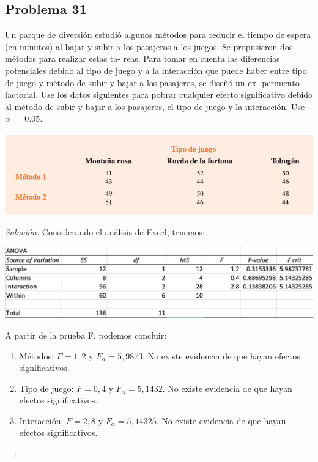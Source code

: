 \documentclass[a4paper,12pt]{article}
\newenvironment{solution}
  {\renewcommand\qedsymbol{$\blacksquare$}\begin{proof}[Solución]}
  {\end{proof}}
\begin{document}
\subsection{Problema 31}
Un parque de diversión estudió algunos métodos para reducir el tiempo de espera (en minutos) al bajar y subir a los pasajeros a los juegos. Se propusieron dos métodos para realizar estas ta- reas. Para tomar en cuenta las diferencias potenciales debido al tipo de juego y a la interacción que puede haber entre tipo de juego y método de subir y bajar a los pasajeros, se diseñó un ex- perimento factorial. Use los datos siguientes para pobrar cualquier efecto significativo debido al método de subir y bajar a los pasajeros, el tipo de juego y la interacción. Use $\alpha=$ 0.05.
\begin{center}
    \includegraphics[scale=0.5]{Images/31.png}
\end{center}
\begin{solution}
Considerando el análisis de Excel, tenemos: 
\begin{center}
    \includegraphics[scale=0.3]{Images/32-anova.png}
\end{center}
A partir de la prueba F, podemos concluir: 
\begin{enumerate}
    \item Métodos: $F=1,2$ y $F_\alpha=5,9873$. No existe evidencia de que hayan efectos significativos.
    \item Tipo de juego: $F=0,4$ y $F_\alpha=5,1432$. No existe evidencia de que hayan efectos significativos.
    \item Interacción: $F=2,8$ y $F_\alpha=5,14325$. No existe evidencia de que hayan efectos significativos.
\end{enumerate}
\end{solution}
\end{document}
